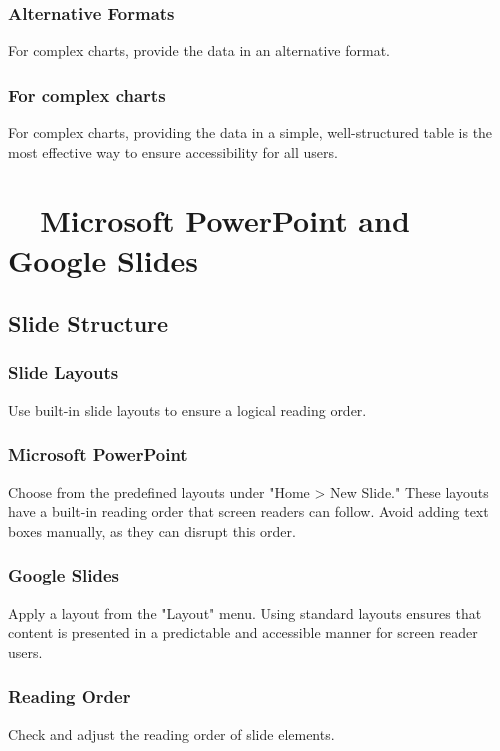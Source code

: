 \subsubsection{Alternative Formats}\label{ch15:sssec:alt-formats}
For complex charts, provide the data in an alternative format.

\subsubsection{For complex charts}\label{ch15:sssec:complex-charts-alt}
For complex charts, providing the data in a simple, well-structured table is the most effective way to ensure accessibility for all users.

\section{~~Microsoft PowerPoint and Google Slides}\label{ch15:sec:ppt-slides}

\subsection{Slide Structure}\label{ch15:ssec:slide-structure}

\subsubsection{Slide Layouts}\label{ch15:sssec:slide-layouts}
Use built-in slide layouts to ensure a logical reading order.

\subsubsection{Microsoft PowerPoint}\label{ch15:sssec:ppt-layouts}
Choose from the predefined layouts under "Home > New Slide." These layouts have a built-in reading order that screen readers can follow. Avoid adding text boxes manually, as they can disrupt this order.

\subsubsection{Google Slides}\label{ch15:sssec:slides-layouts}
Apply a layout from the "Layout" menu. Using standard layouts ensures that content is presented in a predictable and accessible manner for screen reader users.

\subsubsection{Reading Order}\label{ch15:sssec:reading-order}
Check and adjust the reading order of slide elements.

